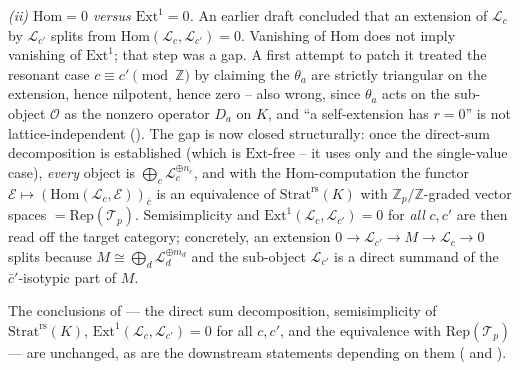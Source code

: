 \documentclass[11pt,reqno]{amsart}
\newcommand{\Zp}{\mathbb{Z}_p}
\newcommand{\ZZ}{\mathbb{Z}}
\newcommand{\cO}{\mathcal{O}}
\newcommand{\cE}{\mathcal{E}}
\newcommand{\cL}{\mathcal{L}}
\newcommand{\cT}{\mathcal{T}}
\newcommand{\Strat}{\mathrm{Strat}}
\newcommand{\rs}{\mathrm{rs}}
\newcommand{\Rep}{\mathrm{Rep}}
\newcommand{\Hom}{\mathrm{Hom}}
\newcommand{\Ext}{\mathrm{Ext}}
\theoremstyle{plain}
\theoremstyle{definition}
\theoremstyle{remark}
\numberwithin{equation}{section}
\begin{document}
\emph{(ii) $\Hom=0$ versus $\Ext^1=0$.}  An earlier draft concluded that
an extension of $\cL_c$ by $\cL_{c'}$ splits from
$\Hom(\cL_c,\cL_{c'})=0$.  Vanishing of $\Hom$ does not imply vanishing of
$\Ext^1$; that step was a gap.  A first attempt to patch it treated the
resonant case $c\equiv c'\pmod\ZZ$ by claiming the $\theta_a$ are
strictly triangular on the extension, hence nilpotent, hence zero -- also
wrong, since $\theta_a$ acts on the sub-object $\cO$ as the nonzero
operator $D_a$ on $K$, and ``a self-extension has $r=0$'' is not
lattice-independent ().  The gap is now closed
structurally: once the direct-sum decomposition is established (which is
$\Ext$-free -- it uses only  and the single-value
case), \emph{every} object is $\bigoplus_c\cL_c^{\oplus n_c}$, and with
the $\Hom$-computation the functor
$\cE\mapsto(\Hom(\cL_c,\cE))_{\bar c}$ is an equivalence of
$\Strat^{\rs}(K)$ with $\Zp/\ZZ$-graded vector spaces $=\Rep(\cT_p)$.
Semisimplicity and $\Ext^1(\cL_c,\cL_{c'})=0$ for \emph{all} $c,c'$ are
then read off the target category; concretely, an extension
$0\to\cL_{c'}\to M\to\cL_c\to0$ splits because $M\cong\bigoplus_d\cL_d^{\oplus m_d}$
and the sub-object $\cL_{c'}$ is a direct summand of the
$\bar c'$-isotypic part of $M$.

The conclusions of  --- the direct sum
decomposition, semisimplicity of $\Strat^{\rs}(K)$,
$\Ext^1(\cL_c,\cL_{c'})=0$ for all $c,c'$, and the equivalence with
$\Rep(\cT_p)$ --- are unchanged, as are the downstream statements
depending on them ( and
).
\end{document}

